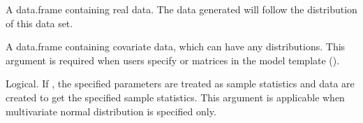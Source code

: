 \documentclass[a4paper]{book}
\begin{document}
\begin{Arguments}
\begin{ldescription}
\item[\code{realData}] 
A data.frame containing real data. The data generated will follow the distribution of this data set.

\item[\code{covData}]  
A data.frame containing covariate data, which can have any distributions. This argument is required when users specify  or  matrices in the model template ().

\item[\code{empirical}]  
Logical. If , the specified parameters are treated as sample statistics and data are created to get the specified sample statistics. This argument is applicable when multivariate normal distribution is specified only.

\end{ldescription}
\end{Arguments}
%
\end{document}
